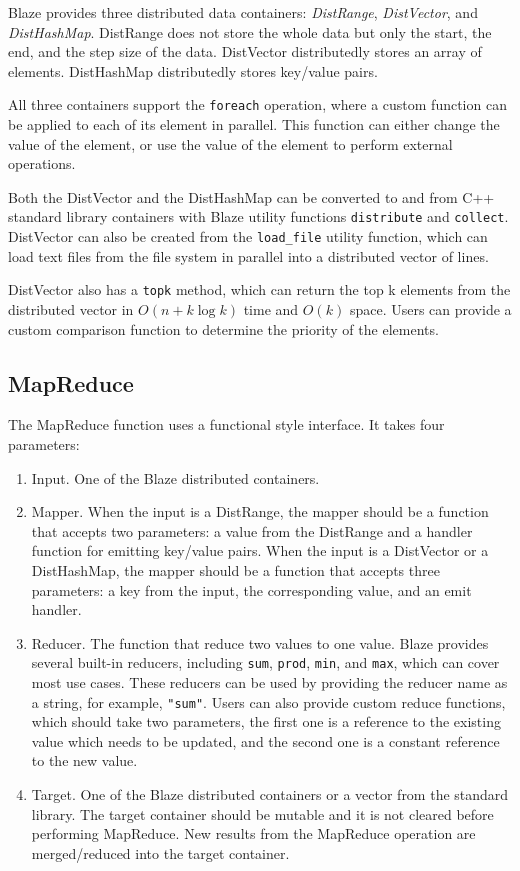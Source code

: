 Blaze provides three distributed data containers: \emph{DistRange}, \emph{DistVector}, and \emph{DistHashMap}.
DistRange does not store the whole data but only the start, the end, and the step size of the data.
DistVector distributedly stores an array of elements.
DistHashMap distributedly stores key/value pairs.

All three containers support the \lstinline{foreach} operation, where a custom function can be applied to each of its element in parallel.
This function can either change the value of the element, or use the value of the element to perform external operations.

Both the DistVector and the DistHashMap can be converted to and from C++ standard library containers with Blaze utility functions \lstinline{distribute} and \lstinline{collect}.
DistVector can also be created from the \lstinline{load_file} utility function, which can load text files from the file system in parallel into a distributed vector of lines.

DistVector also has a \lstinline{topk} method, which can return the top k elements from the distributed vector in $O(n+k\log k)$ time and $O(k)$ space.
Users can provide a custom comparison function to determine the priority of the elements.

\subsection{MapReduce}

The MapReduce function uses a functional style interface.
It takes four parameters:
\begin{enumerate}
    \item Input. One of the Blaze distributed containers.
    \item Mapper. When the input is a DistRange, the mapper should be a function that accepts two parameters: a value from the DistRange and a handler function for emitting key/value pairs.
    When the input is a DistVector or a DistHashMap, the mapper should be a function that accepts three parameters: a key from the input, the corresponding value, and an emit handler.
    \item Reducer. The function that reduce two values to one value.
    Blaze provides several built-in reducers, including \lstinline{sum}, \lstinline{prod}, \lstinline{min}, and \lstinline{max}, which can cover most use cases.
    These reducers can be used by providing the reducer name as a string, for example, \lstinline{"sum"}.
    Users can also provide custom reduce functions, which should take two parameters, the first one is a reference to the existing value which needs to be updated, and the second one is a constant reference to the new value.
    \item Target. One of the Blaze distributed containers or a vector from the standard library.
    The target container should be mutable and it is not cleared before performing MapReduce.
    New results from the MapReduce operation are merged/reduced into the target container.
\end{enumerate}

